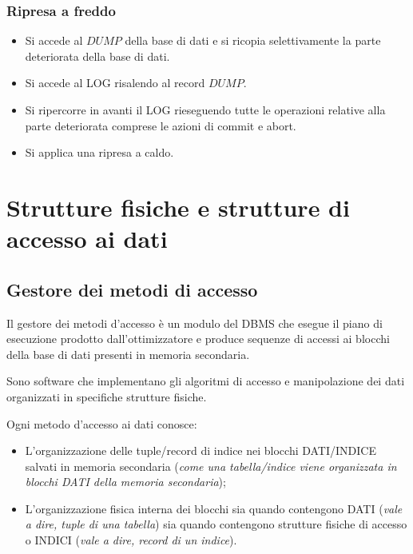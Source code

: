 \documentclass[oneside,a4paper,11pt]{book}
\theoremstyle{italicstyle}
\theoremstyle{normStyle}
\begin{document}
\subsection{Ripresa a freddo}
\begin{itemize}
    \item Si accede al $DUMP$ della base di dati e si ricopia selettivamente la 
    parte deteriorata della base di dati.
    \item Si accede al LOG risalendo al record $DUMP$.
    \item Si ripercorre in avanti il LOG rieseguendo tutte le operazioni relative alla parte deteriorata
    comprese le azioni di commit e abort.
    \item Si applica una ripresa a caldo.
\end{itemize}
\chapter{Strutture fisiche e strutture di accesso ai dati}
\section{Gestore dei metodi di accesso}
Il gestore dei metodi d'accesso è un modulo del DBMS che esegue il piano di esecuzione 
prodotto dall'ottimizzatore e produce sequenze di accessi ai blocchi della base di dati 
presenti in memoria secondaria.
\begin{tcolorbox}[title={Metodi d'accesso}]
Sono software che implementano gli algoritmi di accesso e manipolazione dei dati 
organizzati in specifiche strutture fisiche.
\end{tcolorbox}
Ogni metodo d'accesso ai dati conosce:
\begin{itemize}
    \item L'organizzazione delle tuple/record di indice nei blocchi DATI/INDICE salvati
    in memoria secondaria (\textit{come una tabella/indice viene organizzata 
    in blocchi DATI della memoria secondaria});
    \item L’organizzazione fisica interna dei blocchi sia quando contengono DATI 
    (\textit{vale a dire, tuple di una tabella}) sia quando contengono strutture 
    fisiche di accesso o INDICI (\textit{vale a dire, record di un indice}).
\end{itemize}
\end{document}
